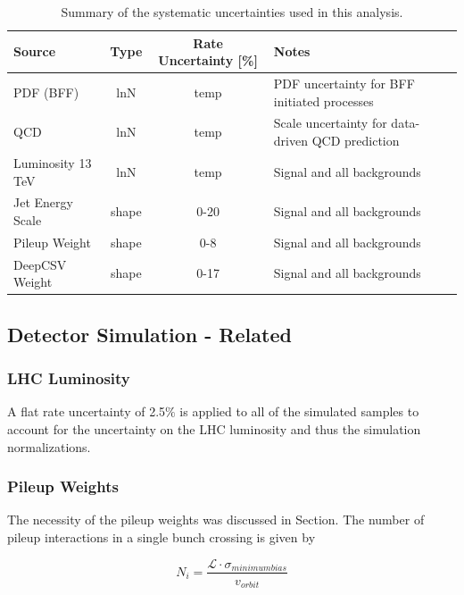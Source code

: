 \begin{table}
	\centering
	\begin{tabular}{lccl}%
		\hline
		Source                                            & Type  & Rate Uncertainty [\%] & Notes \\
		\hline
		PDF (BFF)                                  & lnN   & temp         & PDF uncertainty for BFF initiated processes  \\
		\hline
		QCD                                               & lnN   & temp          & Scale uncertainty for data-driven QCD prediction \\
		\hline
		Luminosity 13 TeV                          & lnN   & temp         & Signal and all backgrounds \\
		Jet Energy Scale                                  & shape & 0-20        & Signal and all backgrounds \\
		Pileup Weight                                     & shape & 0-8         & Signal and all backgrounds \\
		DeepCSV Weight                                        & shape & 0-17        & Signal and all backgrounds \\
		\hline
	\end{tabular}
	\caption{Summary of the systematic uncertainties used in this analysis.}
	\label{tab:systematics_summary}
\end{table}

\subsection{Detector Simulation - Related}

\subsubsection{LHC Luminosity}
A flat rate uncertainty of 2.5$\%$ is applied to all of the simulated samples to account for the uncertainty on the LHC luminosity and thus the simulation normalizations\cite{CMS-PAS-LUM-17-001}.
	 
\subsubsection{Pileup Weights}
The necessity of the pileup weights was discussed in Section. The number of pileup interactions in a single bunch crossing is given by
	 
\begin{equation}
N_{i} = \frac{\mathcal{L}\cdot \sigma_{minimum bias}}{v_{orbit}}
\end{equation}

